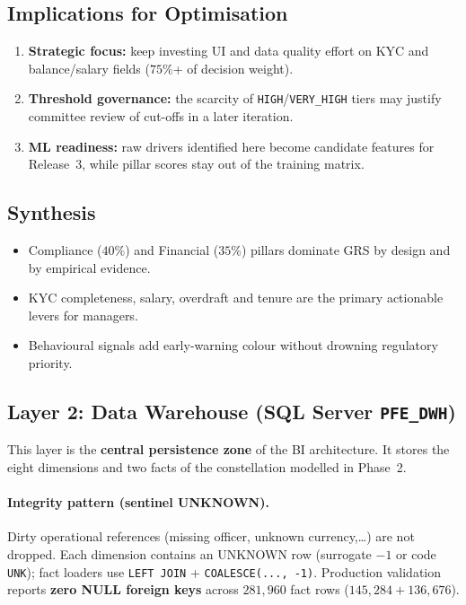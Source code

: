 \subsection{Implications for Optimisation}
\begin{enumerate}
    \item \textbf{Strategic focus:} keep investing UI and data quality effort on KYC
          and balance/salary fields ($75\%$+ of decision weight).
    \item \textbf{Threshold governance:} the scarcity of \texttt{HIGH}/\texttt{VERY\_HIGH}
          tiers may justify committee review of cut-offs in a later iteration.
    \item \textbf{ML readiness:} raw drivers identified here become candidate features
          for Release~3, while pillar scores stay out of the training matrix.
\end{enumerate}

\subsection{Synthesis}
\begin{itemize}
    \item Compliance ($40\%$) and Financial ($35\%$) pillars dominate GRS by design
          and by empirical evidence.
    \item KYC completeness, salary, overdraft and tenure are the primary actionable
          levers for managers.
    \item Behavioural signals add early-warning colour without drowning regulatory
          priority.
\end{itemize}

\subsection{Layer 2: Data Warehouse (SQL Server \texttt{PFE\_DWH})}
This layer is the \textbf{central persistence zone} of the BI architecture. It
stores the eight dimensions and two facts of the constellation modelled in
Phase~2.

\paragraph{Integrity pattern (sentinel UNKNOWN).}
Dirty operational references (missing officer, unknown currency,\ldots) are not
dropped. Each dimension contains an UNKNOWN row (surrogate $-1$ or code
\texttt{UNK}); fact loaders use \texttt{LEFT JOIN} + \texttt{COALESCE(..., -1)}.
Production validation reports \textbf{zero NULL foreign keys} across
$281{,}960$ fact rows ($145{,}284 + 136{,}676$).

